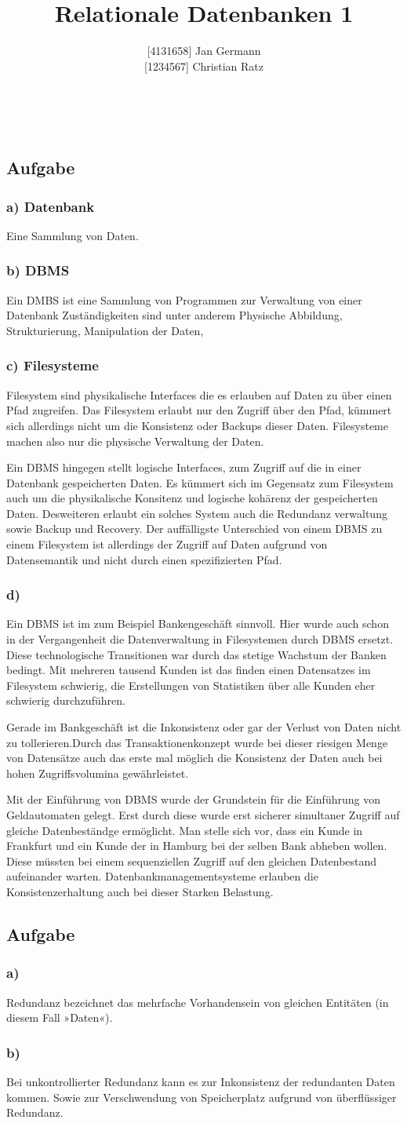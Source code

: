 \documentclass[12pt,a4paper,DIV=9]{scrartcl}
\author{{[}4131658{]} Jan Germann \\{[}1234567{]} Christian Ratz}
\title{Relationale Datenbanken 1}
\newcounter{temp}
\newcommand{\aufgabe}[1]{
  \setcounter{temp}{\value{subsection}}
  \setcounter{subsection}{#1}
  \addtocounter{subsection}{-1}
  \subsection{Aufgabe}
  \setcounter{subsection}{\value{temp}}
}
\newcommand{\teil}[2][]{
  \subsubsection*{#2) #1}
}
\renewcommand{\author}[1]{\renewcommand{\author}{#1}}
\renewcommand{\title}[1]{\renewcommand{\title}{#1}}
\newcommand{\makehomeworktitle}{
  \begin{minipage}{6.5cm}
    \sf{\author}
  \end{minipage}
  \begin{minipage}{6.5cm}
    \begin{flushright}
      \sf{\title\\\today}
    \end{flushright}
  \end{minipage}
  \\[0.2cm]
  \begin{center}
    \sf{
      \color{blue}{
        \LARGE{Aufgabenblatt \blattnr}
      }
    }
  \end{center}
  \vspace{0.1cm}
}
\begin{document}
\makehomeworktitle

\aufgabe{2}
\teil[Datenbank]{a}
Eine Sammlung von Daten.

\teil[DBMS]{b}
  Ein DMBS ist eine Sammlung von Programmen zur Verwaltung von einer Datenbank
Zuständigkeiten sind unter anderem Physische Abbildung, Strukturierung, Manipulation der Daten,

\teil[Filesysteme]{c}
  Filesystem sind physikalische Interfaces die es erlauben auf Daten zu über einen Pfad zugreifen. Das Filesystem erlaubt nur den Zugriff über den Pfad, kümmert sich allerdings nicht um die Konsistenz oder Backups dieser Daten. Filesysteme machen also nur die physische Verwaltung der Daten.

  Ein DBMS hingegen stellt logische Interfaces, zum Zugriff auf die in einer Datenbank gespeicherten Daten. Es kümmert sich im Gegensatz zum Filesystem auch um die physikalische Konsitenz und logische kohärenz der gespeicherten Daten. Desweiteren erlaubt ein solches System auch die Redundanz verwaltung sowie Backup und Recovery. Der auffälligste Unterschied von einem DBMS zu einem Filesystem ist allerdings der Zugriff auf Daten aufgrund von Datensemantik und nicht durch einen spezifizierten Pfad.

\teil{d}
  Ein DBMS ist im zum Beispiel Bankengeschäft sinnvoll. Hier wurde auch schon in der Vergangenheit die Datenverwaltung in Filesystemen durch DBMS ersetzt. Diese technologische Transitionen war durch das stetige Wachstum der Banken bedingt. Mit mehreren tausend Kunden ist das finden einen Datensatzes im Filesystem schwierig, die Erstellungen von Statistiken über alle Kunden eher schwierig durchzuführen.

  Gerade im Bankgeschäft ist die Inkonsistenz oder gar der Verlust von Daten nicht zu tollerieren.Durch das Transaktionenkonzept wurde bei dieser riesigen Menge von Datensätze auch das erste mal möglich die Konsistenz der Daten auch bei hohen Zugriffsvolumina gewährleistet.

  Mit der Einführung von DBMS wurde der Grundstein für die Einführung von Geldautomaten gelegt. Erst durch diese wurde erst sicherer simultaner Zugriff auf gleiche Datenbeständge ermöglicht. Man stelle sich vor, dass ein Kunde in Frankfurt und ein Kunde der in Hamburg bei der selben Bank abheben wollen. Diese müssten bei einem sequenziellen Zugriff auf den gleichen Datenbestand aufeinander warten. Datenbankmanagementsysteme erlauben die Konsistenzerhaltung auch bei dieser Starken Belastung.

\aufgabe{3}
\teil{a}
  Redundanz bezeichnet das mehrfache Vorhandensein von gleichen Entitäten (in diesem Fall »Daten«).
\teil{b}
  Bei unkontrollierter Redundanz kann es zur Inkonsistenz der redundanten Daten kommen. Sowie zur Verschwendung von Speicherplatz aufgrund von überflüssiger Redundanz.
\end{document}
